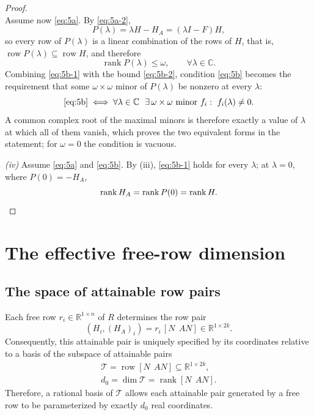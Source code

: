 \documentclass[journal]{IEEEtran}
\theoremstyle{plainn}
\theoremstyle{remark}
\begin{document}
\begin{proof}
\begin{equation}
\end{equation}
 Assume now \eqref{eq:5a}. By \eqref{eq:5a-2},
\begin{equation*}
P(\lambda)=\lambda H-H_A=(\lambda I-F)H ,
\end{equation*}
so every row of $P(\lambda)$ is a linear combination of the rows of $H$, that is, $\operatorname{row}P(\lambda)\subseteq\operatorname{row}H$, and therefore
\begin{equation}\label{eq:5b-2}
\operatorname{rank}P(\lambda)\le\omega,\qquad \forall\lambda\in\mathbb C .
\end{equation}
Combining \eqref{eq:5b-1} with the bound \eqref{eq:5b-2}, condition \eqref{eq:5b} becomes the requirement that some $\omega\times\omega$ minor of $P(\lambda)$ be nonzero at every $\lambda$:
\begin{equation*}
\eqref{eq:5b}
\iff
\forall\lambda\in\mathbb C\ \ \exists\,\omega\times\omega\text{ minor } f_i:\ f_i(\lambda)\neq0 .
\end{equation*}
A common complex root of the maximal minors is therefore exactly a value of $\lambda$ at which all of them vanish, which proves the two equivalent forms in the statement; for $\omega=0$ the condition is vacuous.

\emph{(iv)} Assume \eqref{eq:5a} and \eqref{eq:5b}. By (iii), \eqref{eq:5b-1} holds for every $\lambda$; at $\lambda=0$, where $P(0)=-H_A$,
\begin{equation*}
\operatorname{rank}H_A=\operatorname{rank}P(0)=\operatorname{rank}H . \qedhere
\end{equation*}
\end{proof}

\section{The effective free-row dimension}\label{sec:dimension}

\subsection{The space of attainable row pairs}\label{sec:free}

Each free row $r_i\in\mathbb R^{1\times n}$ of $R$ determines the row pair
\begin{equation*}
(H_i,(H_A)_i)=r_i\,[N\ \ AN] \in\mathbb R^{1\times 2k}.
\end{equation*}
Consequently, this attainable pair is uniquely specified by its coordinates relative to a basis of the subspace of attainable pairs
\begin{equation*}
\begin{gathered}
\mathcal T=\operatorname{row}[N\ \ AN]\subseteq\mathbb R^{1\times 2k},\\
d_0=\dim\mathcal T=\operatorname{rank}[N\ \ AN].
\end{gathered}
\end{equation*}
Therefore, a rational basis of $\mathcal T$ allows each attainable pair generated by a free row to be parameterized by exactly $d_0$ real coordinates.
\end{document}
